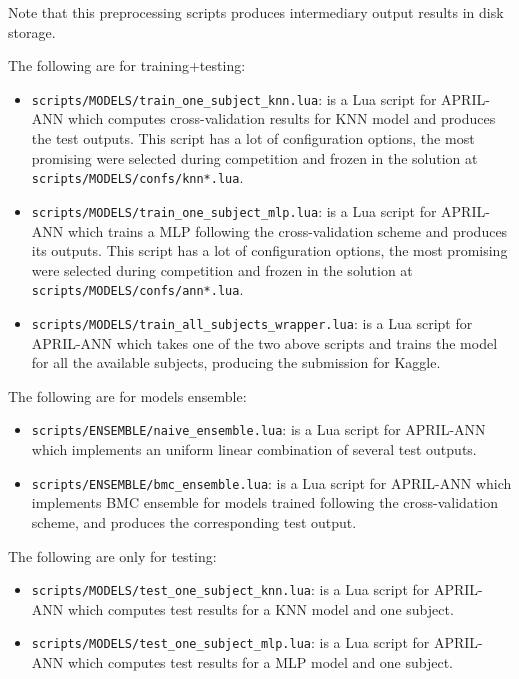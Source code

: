 \documentclass[a4paper,english,twoside]{article}
\begin{document}
\noindent Note that this preprocessing scripts produces intermediary output
results in disk storage.

The following are for training+testing:

\begin{itemize}
\item \verb+scripts/MODELS/train_one_subject_knn.lua+: is a Lua script for
  APRIL-ANN which computes cross-validation results for KNN model and produces
  the test outputs. This script has a lot of configuration options, the most
  promising were selected during competition and frozen in the solution at
  \verb+scripts/MODELS/confs/knn*.lua+.
\item \verb+scripts/MODELS/train_one_subject_mlp.lua+: is a Lua script for
  APRIL-ANN which trains a MLP following the cross-validation scheme and
  produces its outputs. This script has a lot of configuration options, the most
  promising were selected during competition and frozen in the solution at
  \verb+scripts/MODELS/confs/ann*.lua+.
\item \verb+scripts/MODELS/train_all_subjects_wrapper.lua+: is a Lua script for
  APRIL-ANN which takes one of the two above scripts and trains the model for
  all the available subjects, producing the submission for Kaggle.
\end{itemize}

The following are for models ensemble:

\begin{itemize}
\item \verb+scripts/ENSEMBLE/naive_ensemble.lua+: is a Lua script for
  APRIL-ANN which implements an uniform linear combination of several test
  outputs.
\item \verb+scripts/ENSEMBLE/bmc_ensemble.lua+: is a Lua script for APRIL-ANN
  which implements BMC ensemble for models trained following the
  cross-validation scheme, and produces the corresponding test output.
\end{itemize}

The following are only for testing:

\begin{itemize}
\item \verb+scripts/MODELS/test_one_subject_knn.lua+: is a Lua script for
  APRIL-ANN which computes test results for a KNN model and one subject.
\item \verb+scripts/MODELS/test_one_subject_mlp.lua+: is a Lua script for
  APRIL-ANN which computes test results for a MLP model and one subject.
\end{itemize}
\end{document}
